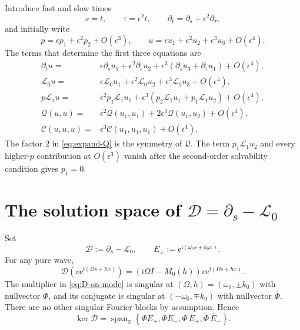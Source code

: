 \documentclass[11pt]{article}
\newcommand{\ii}{\mathrm{i}}
\newcommand{\ee}{\mathrm{e}}
\newcommand{\cQ}{\mathcal{Q}}
\newcommand{\cC}{\mathcal{C}}
\newcommand{\cL}{\mathcal{L}}
\newcommand{\cD}{\mathcal{D}}
\DeclareMathOperator{\spanop}{span}
\begin{document}
Introduce fast and slow times
\begin{equation}
 s=t,
 \qquad \tau=\epsilon^2t,
 \qquad \partial_t=\partial_s+\epsilon^2\partial_\tau,
 \label{eq:slow-time}
\end{equation}
and initially write
\begin{equation}
 p=\epsilon p_1+\epsilon^2p_2+O(\epsilon^3),
 \qquad
 u=\epsilon u_1+\epsilon^2u_2+\epsilon^3u_3+O(\epsilon^4).
 \label{eq:expansions}
\end{equation}
The terms that determine the first three equations are
\begin{align}
 \partial_tu={}&\epsilon\partial_su_1+\epsilon^2\partial_su_2
 +\epsilon^3(\partial_su_3+\partial_\tau u_1)+O(\epsilon^4),
 \label{eq:expand-time}\\
 \cL_0u={}&\epsilon\cL_0u_1+\epsilon^2\cL_0u_2
 +\epsilon^3\cL_0u_3+O(\epsilon^4),
 \label{eq:expand-L0}\\
 p\cL_1u={}&\epsilon^2p_1\cL_1u_1
 +\epsilon^3(p_2\cL_1u_1+p_1\cL_1u_2)+O(\epsilon^4),
 \label{eq:expand-L1}\\
 \cQ(u,u)={}&\epsilon^2\cQ(u_1,u_1)
 +2\epsilon^3\cQ(u_1,u_2)+O(\epsilon^4),
 \label{eq:expand-Q}\\
 \cC(u,u,u)={}&\epsilon^3\cC(u_1,u_1,u_1)+O(\epsilon^4).
 \label{eq:expand-C}
\end{align}
The factor $2$ in \eqref{eq:expand-Q} is the symmetry of $\cQ$.  The term
$p_1\cL_1u_2$ and every higher-$p$ contribution at $O(\epsilon^3)$ vanish
after the second-order solvability condition gives $p_1=0$.

\section{The solution space of
\texorpdfstring{$\cD=\partial_s-\cL_0$}{D = ds - L0}}

Set
\begin{equation}
 \cD:=\partial_s-\cL_0,
 \qquad
 E_\pm:=\ee^{\ii(\omega_0s\pm k_0x)}.
 \label{eq:D-and-E}
\end{equation}
For any pure wave,
\begin{equation}
 \cD\left(v\ee^{\ii(\Omega s+hx)}\right)
 =\left(\ii\Omega I-M_0(h)\right)v
 \ee^{\ii(\Omega s+hx)}.
 \label{eq:D-on-mode}
\end{equation}
The multiplier in \eqref{eq:D-on-mode} is singular at
$(\Omega,h)=(\omega_0,\pm k_0)$ with nullvector $\Phi$, and its conjugate is
singular at $(-\omega_0,\mp k_0)$ with nullvector $\overline\Phi$.  There are
no other singular Fourier blocks by assumption.  Hence
\begin{equation}
 \ker\cD
 =\spanop_{\mathbb R}\left\{
 \Phi E_+,\Phi E_-,\overline\Phi\,\overline E_+,
 \overline\Phi\,\overline E_-
 \right\}.
 \label{eq:kernel-D}
\end{equation}
\end{document}
